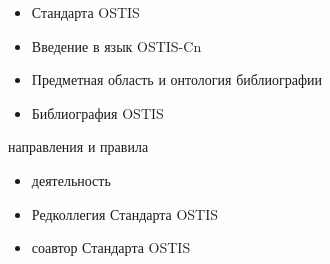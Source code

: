 \begin{SCn}
{\begin{scnitemize}
\begin{itemize}
		\item Стандарта OSTIS
		\item Введение в язык OSTIS-Cn	
		\item Предметная область и онтология библиографии
		\item Библиография OSTIS
	\end{itemize}	
\end{scnitemize}
\begin{scnitemize}
	\item направления и правила	
	\begin{itemize}
		\item деятельность	
		\item Редколлегия Стандарта OSTIS
		\item соавтор Стандарта OSTIS
	\end{itemize}
\end{scnitemize}}

	
\end{SCn}